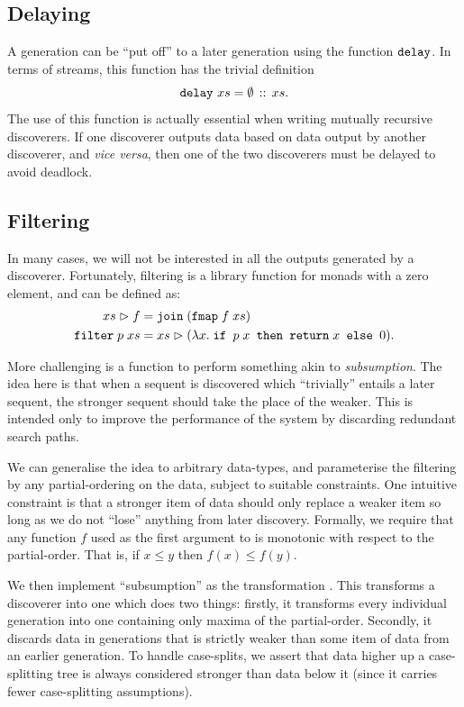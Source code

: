 \subsection{Delaying}
A generation can be ``put off'' to a later generation using the function $\texttt{delay}$. In terms of streams, this function has the trivial definition
\begin{displaymath}
  \texttt{delay}\ xs = \emptyset\,::\,xs.
\end{displaymath}
The use of this function is actually essential when writing mutually recursive discoverers. If one discoverer outputs data based on data output by another discoverer, and \emph{vice versa}, then one of the two discoverers must be delayed to avoid deadlock.

\subsection{Filtering}\label{sec:Filtering}
In many cases, we will not be interested in all the outputs generated by a discoverer. Fortunately, filtering is a library function for monads with a zero element, and can be defined as:
\begin{align*}
xs \vartriangleright f &= \texttt{join}\;(\texttt{fmap}\;f\;xs) \\
\texttt{filter}\;p\;xs &= xs \vartriangleright (\lambda x.\;\texttt{if } p\;x \texttt{ then } \texttt{return}\;x \texttt { else } 0).
\end{align*}

More challenging is a function to perform something akin to \emph{subsumption}. The idea here is that when a sequent is discovered which ``trivially'' entails a later sequent, the stronger sequent should take the place of the weaker. This is intended only to improve the performance of the system by discarding redundant search paths. 

We can generalise the idea to arbitrary data-types, and parameterise the filtering by any partial-ordering on the data, subject to suitable constraints. One intuitive constraint is that a stronger item of data should only replace a weaker item so long as we do not ``lose'' anything from later discovery. Formally, we require that any function $f$ used as the first argument to  is monotonic with respect to the partial-order. That is, if $x \leq y$ then $f(x) \leq f(y)$. 

We then implement ``subsumption'' as the transformation . This transforms a discoverer into one which does two things: firstly, it transforms every individual generation into one containing only maxima of the partial-order. Secondly, it discards data in generations that is strictly weaker than some item of data from an earlier generation. To handle case-splits, we assert that data higher up a case-splitting tree is always considered stronger than data below it (since it carries fewer case-splitting assumptions).

